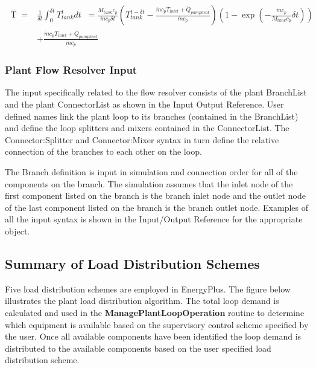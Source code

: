\begin{equation}
\begin{split}
\mathop T\limits^ -   =& \frac{1}{{\delta t}}\int_0^{\delta t} {T_{tank}^tdt} \;\; = \frac{{{M_{tank}}{c_p}}}{{\dot m{c_p}\delta t}}\left( {T_{tank}^{t - \delta t} - \frac{{\dot m{c_p}{T_{inlet}} + {{\dot Q}_{pumpheat}}}}{{\dot m{c_p}}}} \right)\left( {1 - \exp \left( { - \frac{{\dot m{c_p}}}{{{M_{tank}}{c_p}}}\delta t} \right)} \right) \\
&+ \frac{{\dot m{c_p}{T_{inlet}} + {{\dot Q}_{pumpheat}}}}{{\dot m{c_p}}}
\end{split}
\end{equation}

\subsubsection{Plant Flow Resolver Input}\label{plant-flow-resolver-input}

The input specifically related to the flow resolver consists of the plant BranchList and the plant ConnectorList as shown in the Input Output Reference. User defined names link the plant loop to its branches (contained in the BranchList) and define the loop splitters and mixers contained in the ConnectorList. The Connector:Splitter and Connector:Mixer syntax in turn define the relative connection of the branches to each other on the loop.

The Branch definition is input in simulation and connection order for all of the components on the branch. The simulation assumes that the inlet node of the first component listed on the branch is the branch inlet node and the outlet node of the last component listed on the branch is the branch outlet node. Examples of all the input syntax is shown in the Input/Output Reference for the appropriate object.

\subsection{Summary of Load Distribution Schemes}\label{summary-of-load-distribution-schemes}

Five load distribution schemes are employed in EnergyPlus. The figure below illustrates the plant load distribution algorithm. The total loop demand is calculated and used in the \textbf{ManagePlantLoopOperation} routine to determine which equipment is available based on the supervisory control scheme specified by the user. Once all available components have been identified the loop demand is distributed to the available components based on the user specified load distribution scheme.


